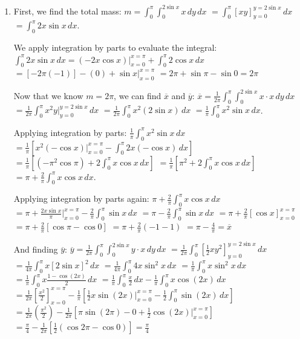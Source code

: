 \begin{Answer}[ref = c_of_m]
\begin{enumerate}
\item First, we find the total mass: $m = \int_0^{\pi} \int_0^{2\sin{x}} x \,dy
\,dx$ 
$= \int_0^{\pi} \left[ xy \right]_{y = 0}^{y = 2\sin{x}}\,dx$ $= \int_0^{\pi} 2
x\sin{x}\,dx$. 

We apply integration by parts to evaluate the integral: 
$\int_0^{\pi} 2x\sin{x}\,dx = \left(-2x \cos{x} \right)|_{x = 0}^{x = \pi} + 
\int_0^{\pi} 2 \cos{x}\,dx$ 
$= \left[-2 \pi (-1) \right] - \left( 0 \right) + \sin{x}|_{x = 0}^{x = \pi}$ 
$= 2\pi + \sin{\pi} - \sin{0} = 2\pi$

Now that we know $m = 2\pi$, we can find $\overline{x}$ and $\overline{y}$: 
$\overline{x} = \frac{1}{2\pi} \int_0^{\pi} \int_0^{2\sin{x}} x \cdot x \,dy 
\,dx$ 
$= \frac{1}{2\pi} \int_0^{\pi} x^2y|_{y = 0}^{y = 2\sin{x}}\,dx$ 
$= \frac{1}{2\pi} \int_0^{\pi} x^2 \left(2\sin{x} \right)\,dx$ 
$= \frac{1}{\pi} \int_0^{\pi} x^2 \sin{x}\,dx$. 

Applying integration by parts: $\frac{1}{\pi} \int_0^{\pi} x^2 \sin{x}\,dx$ 
$= \frac{1}{\pi} \left[ x^2 \left(-\cos{x} \right)|_{x = 0}^{x = \pi} - \int_0^
{\pi} 2x \left( -\cos{x} \right) \,dx \right]$ 
$= \frac{1}{\pi} \left[ \left( -\pi^2 \cos{\pi} \right) + 2\int_0^{\pi} x\cos{x
}\,dx \right]$ 
$= \frac{1}{\pi} \left[ \pi^2 + 2\int_0^{\pi} x\cos{x}\,dx \right]$ $= \pi + 
\frac{2}{\pi} \int_0^{\pi} x\cos{x}\,dx$. 

Applying integration by parts again: $\pi + \frac{2}{\pi} \int_0^{\pi} x\cos{x}
\,dx$ 
$= \pi + \frac{2x\sin{x}}{\pi}|_{x = 0}^{x = \pi} - \frac{2}{\pi} \int_0^{\pi} 
\sin{x}\,dx$
$= \pi -\frac{2}{\pi} \int_0^{\pi} \sin{x}\,dx$
$= \pi + \frac{2}{\pi} \left[ \cos{x} \right]_{x = 0}^{x = \pi}$
$= \pi + \frac{2}{\pi} \left[ \cos{\pi} - \cos{0} \right]$
$= \pi + \frac{2}{\pi} \left(-1 - 1 \right)$ $= \pi - \frac{4}{\pi} = 
\overline{x}$

And finding $\overline{y}$: 
$\overline{y} = \frac{1}{2\pi} \int_0^{\pi} \int_0^{2 \sin{x}} y \cdot x \,dy 
\,dx$
$= \frac{1}{2\pi} \int_0^{\pi} \left[ \frac{1}{2}xy^2 \right]_{y = 0}^{y = 2
\sin{x}} \,dx$
$= \frac{1}{4\pi} \int_0^{\pi} x \left[ 2\sin{x} \right]^2 \,dx$ 
$= \frac{1}{4\pi} \int_0^{\pi} 4x \sin^2{x}\,dx$ 
$= \frac{1}{\pi} \int_0^{\pi} x\sin^2{x}\,dx$ 
$=\frac{1}{\pi} \int_0^{\pi} x \frac{1-\cos{\left(2x\right)}}{2}\,dx$ 
$= \frac{1}{\pi} \int_0^{\pi} \frac{x}{2}\,dx - \frac{1}{\pi} \int_0^{\pi} x 
\cos{(2x)}\,dx$ 
$= \frac{1}{2\pi} \left[ \frac{x^2}{2} \right]_{x = 0}^{x = \pi} - \frac{1}{\pi
} \left[ \frac{1}{2}x\sin{(2x)}|_{x = 0}^{x = \pi} - \frac{1}{2} \int_0^{\pi} 
\sin{(2x)}\,dx \right]$
$= \frac{1}{2\pi} \left( \frac{\pi^2}{2} \right) - \frac{1}{2\pi} \left[ \pi
\sin{(2\pi)} - 0 + \frac{1}{2} \cos{(2x)}|_{x = 0}^{x = \pi} \right]$
$= \frac{\pi}{4} - \frac{1}{2\pi} \left[ \frac{1}{2} \left(\cos{2\pi} - \cos{0}
\right) \right] = \frac{\pi}{4}$


\end{enumerate}
\end{Answer}
